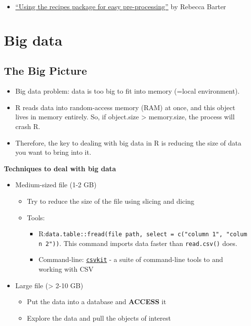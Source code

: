 \documentclass[
]{book}
\providecommand{\tightlist}{%
  \setlength{\itemsep}{0pt}\setlength{\parskip}{0pt}}
\begin{document}
\begin{itemize}
\tightlist
\item
  \href{http://www.rebeccabarter.com/blog/2019-06-06_pre_processing/}{``Using the recipes package for easy pre-processing''} by Rebecca Barter
\end{itemize}

\chapter{Big data}\label{big_data}

\section{The Big Picture}\label{the-big-picture-10}

\begin{itemize}
\tightlist
\item
  Big data problem: data is too big to fit into memory (=local environment).
\item
  R reads data into random-access memory (RAM) at once, and this object lives in memory entirely. So, if object.size \textgreater{} memory.size, the process will crash R.
\item
  Therefore, the key to dealing with big data in R is reducing the size of data you want to bring into it.
\end{itemize}

\textbf{Techniques to deal with big data}

\begin{itemize}
\tightlist
\item
  Medium-sized file (1-2 GB)

  \begin{itemize}
  \tightlist
  \item
    Try to reduce the size of the file using slicing and dicing
  \item
    Tools:

    \begin{itemize}
    \tightlist
    \item
      R:\texttt{data.table::fread(file\ path,\ select\ =\ c("column\ 1",\ "column\ 2"))}. This command imports data faster than \texttt{read.csv()} does.
    \item
      Command-line: \href{https://csvkit.readthedocs.io/en/latest/}{\texttt{csvkit}} - a suite of command-line tools to and working with CSV
    \end{itemize}
  \end{itemize}
\item
  Large file (\textgreater{} 2-10 GB)

  \begin{itemize}
  \tightlist
  \item
    Put the data into a database and \textbf{ACCESS} it
  \item
    Explore the data and pull the objects of interest
  \end{itemize}
\end{itemize}
\end{document}
